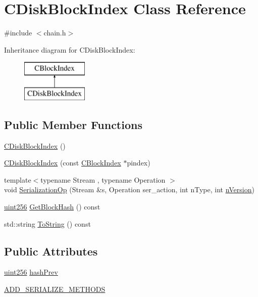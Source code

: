 \hypertarget{class_c_disk_block_index}{}\section{C\+Disk\+Block\+Index Class Reference}
\label{class_c_disk_block_index}


{\ttfamily \#include $<$chain.\+h$>$}

Inheritance diagram for C\+Disk\+Block\+Index\+:\begin{figure}[H]
\begin{center}
\leavevmode
\includegraphics[height=2.000000cm]{class_c_disk_block_index}
\end{center}
\end{figure}
\subsection*{Public Member Functions}
\begin{DoxyCompactItemize}
\item 
\hyperlink{class_c_disk_block_index_a8c460c63b799964ef55e2dbbb74b5ad6}{C\+Disk\+Block\+Index} ()
\item 
\hyperlink{class_c_disk_block_index_a8d76af0058fa72d3d8ff688d27d2a5c9}{C\+Disk\+Block\+Index} (const \hyperlink{class_c_block_index}{C\+Block\+Index} $\ast$pindex)
\item 
{\footnotesize template$<$typename Stream , typename Operation $>$ }\\void \hyperlink{class_c_disk_block_index_a2ef7b51f2777fcc1b9625a0ee000f9b5}{Serialization\+Op} (Stream \&s, Operation ser\+\_\+action, int n\+Type, int \hyperlink{class_c_block_index_a45126301a0a6e26010527a7bbfc1ef58}{n\+Version})
\item 
\hyperlink{classuint256}{uint256} \hyperlink{class_c_disk_block_index_adbe404c55c68be782360b4594d355fad}{Get\+Block\+Hash} () const 
\item 
std\+::string \hyperlink{class_c_disk_block_index_a86ef9d71fb72868699145b73f3e3e583}{To\+String} () const 
\end{DoxyCompactItemize}
\subsection*{Public Attributes}
\begin{DoxyCompactItemize}
\item 
\hyperlink{classuint256}{uint256} \hyperlink{class_c_disk_block_index_a3a1730201a8523fb947c4d4f632a4212}{hash\+Prev}
\item 
\hyperlink{class_c_disk_block_index_adfa97e82f2e6db827fc6b8b5e351a1f9}{A\+D\+D\+\_\+\+S\+E\+R\+I\+A\+L\+I\+Z\+E\+\_\+\+M\+E\+T\+H\+O\+D\+S}
\end{DoxyCompactItemize}
